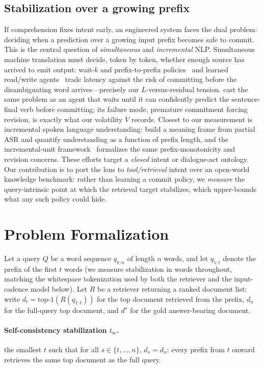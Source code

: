 \documentclass[11pt]{article}
\renewcommand{\cite}{\citep}                         %
\begin{document}
\subsection{Stabilization over a growing prefix}
If comprehension fixes intent early, an engineered system faces the dual problem:
deciding when a prediction over a growing input prefix becomes safe to commit. This
is the central question of \emph{simultaneous} and \emph{incremental} NLP. Simultaneous machine
translation must decide, token by token, whether enough source has arrived to emit
output: wait-$k$ and prefix-to-prefix policies~\cite{ma2019stacl} and learned
read/write agents~\cite{gu2017simultaneous} trade latency against the risk of
committing before the disambiguating word arrives---precisely our $L$-versus-residual
tension. \citet{grissom2014dont} cast the same problem as an agent that waits until
it can confidently predict the sentence-final verb before committing; its failure
mode, premature commitment forcing revision, is exactly what our volatility $V$
records. Closest to our measurement is incremental spoken language understanding:
\citet{devault2011incremental} build a meaning frame from partial ASR and quantify
understanding as a function of prefix length, and the incremental-unit
framework~\cite{schlangen2011incremental} formalizes the same prefix-monotonicity
and revision concerns. These efforts target a \emph{closed} intent or dialogue-act
ontology. Our contribution is to port the lens to \emph{tool/retrieval} intent over
an open-world knowledge benchmark: rather than learning a commit policy, we
\emph{measure} the query-intrinsic point at which the retrieval target stabilizes,
which upper-bounds what any such policy could hide.

\section{Problem Formalization}
Let a query $Q$ be a word sequence $q_{1:n}$ of length $n$ words, and let $q_{1:t}$
denote the prefix of the first $t$ words (we measure stabilization in words
throughout, matching the whitespace tokenization used by both the retriever and
the input-cadence model below). Let $R$ be a retriever returning a
ranked document list; write $d_t = \mathrm{top\text{-}1}(R(q_{1:t}))$ for the top
document retrieved from the prefix, $d_n$ for the full-query top document, and
$d^\star$ for the gold answer-bearing document.

\paragraph{Self-consistency stabilization $t_{\mathrm{sc}}$.} the smallest $t$
such that for all $s \in \{t, \ldots, n\}$, $d_s = d_n$: every prefix from $t$
onward retrieves the same top document as the full query.
\end{document}
